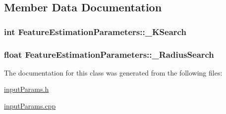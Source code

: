 \subsection{Member Data Documentation}
\hypertarget{classFeatureEstimationParameters_abd46d4a1816d3afcc7b6f70c400444f3}{
\subsubsection[{\-\_\-\-K\-Search}]{\setlength{\rightskip}{0pt plus 5cm}int Feature\-Estimation\-Parameters\-::\-\_\-\-K\-Search\hspace{0.3cm}{\ttfamily [private]}}}\label{classFeatureEstimationParameters_abd46d4a1816d3afcc7b6f70c400444f3}
\hypertarget{classFeatureEstimationParameters_a75aed39eda19a3003041f765d9c346cf}{
\subsubsection[{\-\_\-\-Radius\-Search}]{\setlength{\rightskip}{0pt plus 5cm}float Feature\-Estimation\-Parameters\-::\-\_\-\-Radius\-Search\hspace{0.3cm}{\ttfamily [private]}}}\label{classFeatureEstimationParameters_a75aed39eda19a3003041f765d9c346cf}


The documentation for this class was generated from the following files\-:\begin{DoxyCompactItemize}
\item 
\hyperlink{inputParams_8h}{input\-Params.\-h}\item 
\hyperlink{inputParams_8cpp}{input\-Params.\-cpp}\end{DoxyCompactItemize}
